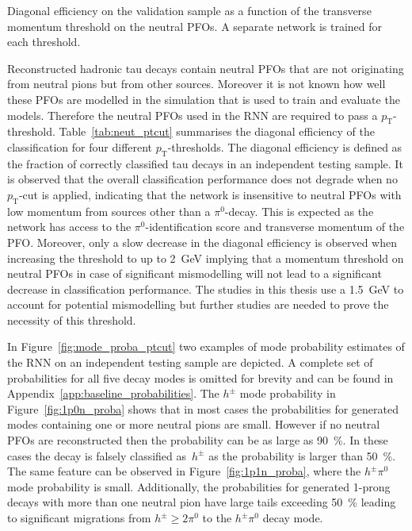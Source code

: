 \begin{table}[htb]
  \centering
  
  \caption{Diagonal efficiency on the validation sample as a function of the
    transverse momentum threshold on the neutral PFOs. A separate network is
    trained for each threshold.}
  \label{tab:neut_ptcut}
\end{table}

Reconstructed hadronic tau decays contain neutral PFOs that are not originating
from neutral pions but from other sources. Moreover it is not known how well
these PFOs are modelled in the simulation that is used to train and evaluate the
models. Therefore the neutral PFOs used in the RNN are required to pass a
$p_\text{T}$-threshold. Table~\ref{tab:neut_ptcut} summarises the diagonal
efficiency of the classification for four different $p_\text{T}$-thresholds. The
diagonal efficiency is defined as the fraction of correctly classified tau
decays in an independent testing sample.
It is observed that the overall classification performance does not degrade when
no $p_\text{T}$-cut is applied, indicating that the network is insensitive to
neutral PFOs with low momentum from sources other than a $\pi^0$-decay. This is
expected as the network has access to the $\pi^0$-identification score and
transverse momentum of the PFO. Moreover, only a slow decrease in the diagonal
efficiency is observed when increasing the threshold to up to \SI{2}{\GeV}
implying that a momentum threshold on neutral PFOs in case of significant
mismodelling will not lead to a significant decrease in classification
performance. The studies in this thesis use a \SI{1.5}{\giga\electronvolt} to
account for potential mismodelling but further studies are needed to prove the
necessity of this threshold.

In Figure~\ref{fig:mode_proba_ptcut} two examples of mode probability estimates
of the RNN on an independent testing sample are depicted. A complete set of
probabilities for all five decay modes is omitted for brevity and can be found
in Appendix~\ref{app:baseline_probabilities}. The $h^\pm$ mode probability in
Figure~\ref{fig:1p0n_proba} shows that in most cases the probabilities for
generated modes containing one or more neutral pions are small. However if no
neutral PFOs are reconstructed then the probability can be as large as
\SI{90}{\percent}. In these cases the decay is falsely classified as~$h^\pm$ as
the probability is larger than \SI{50}{\percent}. The same feature can be
observed in Figure~\ref{fig:1p1n_proba}, where the $h^\pm \pi^0$ mode
probability is small. Additionally, the probabilities for generated 1-prong
decays with more than one neutral pion have large tails exceeding
\SI{50}{\percent} leading to significant migrations from $h^\pm \geq 2 \pi^0$ to
the $h^\pm \pi^0$ decay mode. 

